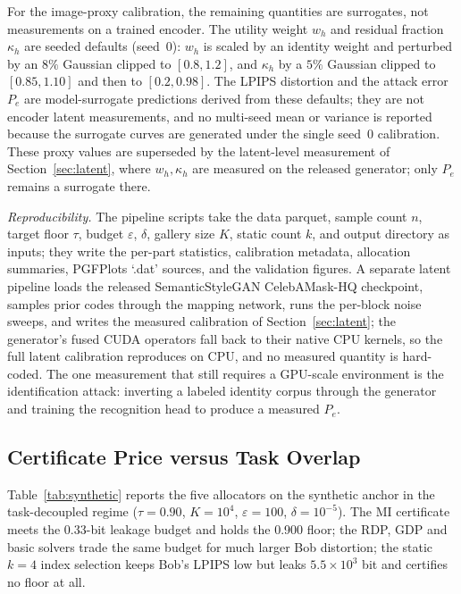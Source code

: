 \documentclass{ieeetj}
\theoremstyle{plain}
\theoremstyle{definition}
\begin{document}
For the image-proxy calibration, the remaining quantities are surrogates, not
measurements on a trained encoder. The utility weight $w_h$ and residual
fraction $\kappa_h$ are seeded defaults (seed~0): $w_h$ is scaled by an
identity weight and perturbed by an $8\%$ Gaussian clipped to $[0.8,1.2]$, and
$\kappa_h$ by a $5\%$ Gaussian clipped to $[0.85,1.10]$ and then to
$[0.2,0.98]$. The LPIPS distortion and the attack error $P_e$ are
model-surrogate predictions derived from these defaults; they are not encoder
latent measurements, and no multi-seed mean or variance is reported because
the surrogate curves are generated under the single seed~0 calibration. These
proxy values are superseded by the latent-level measurement of
Section~\ref{sec:latent}, where $w_h,\kappa_h$ are measured on the released
generator; only $P_e$ remains a surrogate there.

\emph{Reproducibility.} The pipeline scripts take the data parquet, sample
count $n$, target floor $\tau$, budget $\varepsilon$, $\delta$, gallery size
$K$, static count $k$, and output directory as inputs; they write the per-part
statistics, calibration metadata, allocation summaries, PGFPlots `.dat'
sources, and the validation figures. A separate latent pipeline loads the
released SemanticStyleGAN CelebAMask-HQ checkpoint, samples prior codes through
the mapping network, runs the per-block noise sweeps, and writes the measured
calibration of Section~\ref{sec:latent}; the generator's fused CUDA operators
fall back to their native CPU kernels, so the full latent calibration
reproduces on CPU, and no measured quantity is hard-coded. The one measurement
that still requires a GPU-scale environment is the identification attack:
inverting a labeled identity corpus through the generator and training the
recognition head to produce a measured $P_e$.

\subsection{Certificate Price versus Task Overlap}

Table~\ref{tab:synthetic} reports the five allocators on the synthetic anchor
in the task-decoupled regime ($\tau=0.90$, $K=10^{4}$, $\varepsilon=100$,
$\delta=10^{-5}$). The MI certificate meets the 0.33-bit leakage budget and
holds the 0.900 floor; the RDP, GDP and basic solvers trade the same budget
for much larger Bob distortion; the static $k=4$ index selection keeps Bob's
LPIPS low but leaks $5.5\times10^{3}$ bit and certifies no floor at all.
\end{document}
